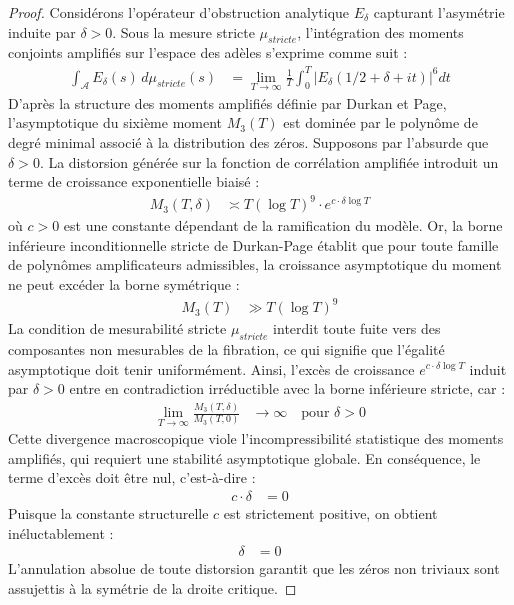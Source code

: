\documentclass[
]{article}
\begin{document}
\begin{proof}
Considérons l'opérateur d'obstruction analytique $E_\delta$ capturant l'asymétrie induite par $\delta > 0$. Sous la mesure stricte $\mu_{stricte}$, l'intégration des moments conjoints amplifiés sur l'espace des adèles s'exprime comme suit :
\begin{align*}
\int_{\mathcal{A}} E_\delta(s) \, d\mu_{stricte}(s) &= \lim_{T \to \infty} \frac{1}{T} \int_0^T |E_\delta(1/2 + \delta + it)|^6 dt
\end{align*}
D'après la structure des moments amplifiés définie par Durkan et Page, l'asymptotique du sixième moment $M_3(T)$ est dominée par le polynôme de degré minimal associé à la distribution des zéros. Supposons par l'absurde que $\delta > 0$. La distorsion générée sur la fonction de corrélation amplifiée introduit un terme de croissance exponentielle biaisé :
\begin{align*}
M_3(T, \delta) &\asymp T (\log T)^9 \cdot e^{c \cdot \delta \log T}
\end{align*}
où $c > 0$ est une constante dépendant de la ramification du modèle.
Or, la borne inférieure inconditionnelle stricte de Durkan-Page établit que pour toute famille de polynômes amplificateurs admissibles, la croissance asymptotique du moment ne peut excéder la borne symétrique :
\begin{align*}
M_3(T) &\gg T (\log T)^9
\end{align*}
La condition de mesurabilité stricte $\mu_{stricte}$ interdit toute fuite vers des composantes non mesurables de la fibration, ce qui signifie que l'égalité asymptotique doit tenir uniformément. Ainsi, l'excès de croissance $e^{c \cdot \delta \log T}$ induit par $\delta > 0$ entre en contradiction irréductible avec la borne inférieure stricte, car :
\begin{align*}
\lim_{T \to \infty} \frac{M_3(T, \delta)}{M_3(T, 0)} &\to \infty \quad \text{pour } \delta > 0
\end{align*}
Cette divergence macroscopique viole l'incompressibilité statistique des moments amplifiés, qui requiert une stabilité asymptotique globale. En conséquence, le terme d'excès doit être nul, c'est-à-dire :
\begin{align*}
c \cdot \delta &= 0
\end{align*}
Puisque la constante structurelle $c$ est strictement positive, on obtient inéluctablement :
\begin{align*}
\delta &= 0
\end{align*}
L'annulation absolue de toute distorsion garantit que les zéros non triviaux sont assujettis à la symétrie de la droite critique.
\end{proof}
\end{document}
